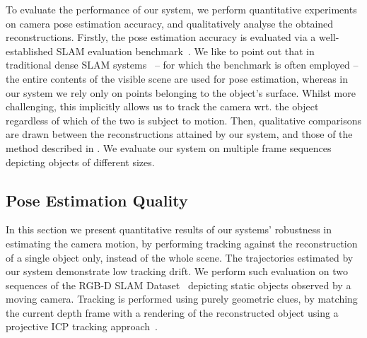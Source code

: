 To evaluate the performance of our system, we perform quantitative experiments on camera pose estimation accuracy, and qualitatively analyse the obtained reconstructions.
Firstly, the pose estimation accuracy is evaluated via a well-established SLAM evaluation benchmark~\cite{sturm12iros}.
We like to point out that %
in traditional dense SLAM systems~\cite{Prisacariu2014,Niessner2013,Newcombe2011} -- for which the benchmark is often employed -- the entire contents of the visible scene are used for pose estimation, whereas in our system we rely only on points belonging to the object's surface.
Whilst more challenging, this implicitly allows us to track the camera wrt. the object regardless of which of the two is subject to motion.
Then, qualitative comparisons are drawn between the reconstructions attained by our system, and those of the method described in \cite{Ren2013}.
We evaluate our system on multiple frame sequences depicting objects of different sizes. %

\subsection{Pose Estimation Quality}
In this section we present quantitative results of our systems' %
robustness in estimating the camera motion, by performing tracking against the reconstruction of a single object only, instead of the whole scene.
The trajectories estimated by our system demonstrate low tracking drift. %
We perform such evaluation on two sequences of the RGB-D SLAM Dataset~\cite{sturm12iros} depicting static objects observed by a moving camera.
Tracking is performed using purely geometric clues, by matching the current depth frame with a rendering of the reconstructed object using a projective ICP tracking approach~\cite{Kahler2016}.


